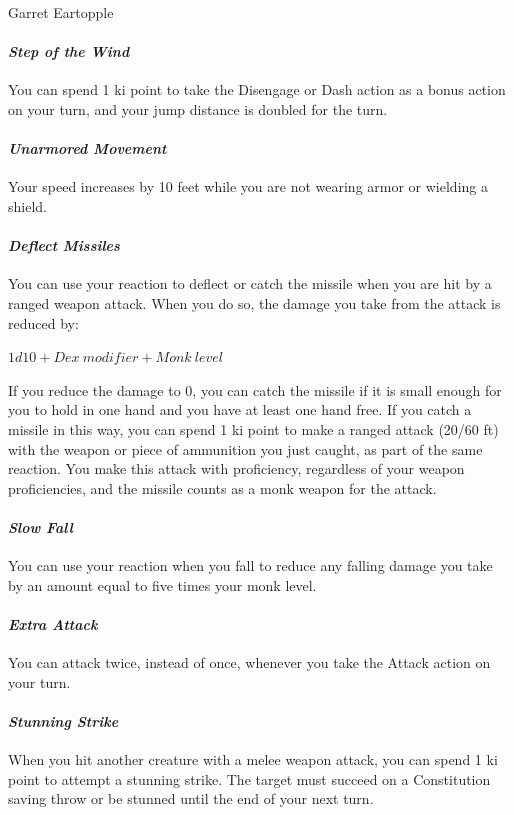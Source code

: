 \documentclass[10pt,twoside,twocolumn]{book}
\begin{document}
\begin{rpg-monsterbox}{Garret Eartopple}
   \paragraph{\emph{Step of the Wind}}
   You can spend 1 ki point to take the Disengage or Dash action as a bonus action on your turn, and your jump distance is doubled for the turn.

   \paragraph{\emph{Unarmored Movement}}
   Your speed increases by 10 feet while you are not wearing armor or wielding a shield.

   \paragraph{\emph{Deflect Missiles}}
   You can use your reaction to deflect or catch the missile when you are hit by a ranged weapon attack.
   When you do so, the damage you take from the attack is reduced by:
   
   $1d10 + Dex~modifier + Monk~level$
   
   \hskip4mm If you reduce the damage to 0, you can catch the missile if it is small enough for you to hold in one hand and you have at least one hand free.
   If you catch a missile in this way, you can spend 1 ki point to make a ranged attack (20/60 ft) with the weapon or piece of ammunition you just caught, as part of the same reaction.
   You make this attack with proficiency, regardless of your weapon proficiencies, and the missile counts as a monk weapon for the attack.

   \paragraph{\emph{Slow Fall}}
   You can use your reaction when you fall to reduce any falling damage you take by an amount equal to five times your monk level.

   \paragraph{\emph{Extra Attack}}
   You can attack twice, instead of once, whenever you take the Attack action on your turn.

   \paragraph{\emph{Stunning Strike}}
   When you hit another creature with a melee weapon attack, you can spend 1 ki point to attempt a stunning strike.
   The target must succeed on a Constitution saving throw or be stunned until the end of your next turn.


\end{rpg-monsterbox}
\end{document}
